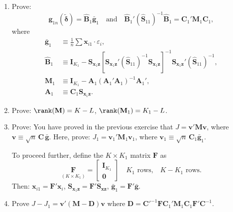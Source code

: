 \begin{problemset}
\begin{enumerate}[label=(\alph*)]
\item Prove:
  \[
    \mathbf{g}_{1n}(\tilde{\boldsymbol{\delta}})
    = \hat{\mathbf{B}}_1 \bar{\mathbf{g}}_1
    \quad \text{and} \quad
    \hat{\mathbf{B}}_1'(\hat{\mathbf{S}}_{11})^{-1} \hat{\mathbf{B}}_1
    = \mathbf{C}_1' \mathbf{M}_1 \mathbf{C}_1,
  \]
  where
  \begin{align*}
    \bar{\mathbf{g}}_1 &\equiv \frac{1}{n} \sum \mathbf{x}_{i1} \cdot \varepsilon_i, \\
    \hat{\mathbf{B}}_1 &\equiv \mathbf{I}_{K_1}
    - \mathbf{S}_{\mathbf{x}_1 \mathbf{z}}
    [\mathbf{S}_{\mathbf{x}_1 \mathbf{z}}'(\hat{\mathbf{S}}_{11})^{-1}
    \mathbf{S}_{\mathbf{x}_1 \mathbf{z}}]^{-1}
    \mathbf{S}_{\mathbf{x}_1 \mathbf{z}}'(\hat{\mathbf{S}}_{11})^{-1}, \\
    \mathbf{M}_1 &\equiv \mathbf{I}_{K_1}
    - \mathbf{A}_1(\mathbf{A}_1'\mathbf{A}_1)^{-1}\mathbf{A}_1', \\
    \mathbf{A}_1 &\equiv \mathbf{C}_1 \mathbf{S}_{\mathbf{x}_1 \mathbf{z}}.
  \end{align*}

\item Prove: $\rank(\mathbf{M}) = K - L$, $\rank(\mathbf{M}_1) = K_1 - L$.

\item Prove: You have proved in the previous exercise that
  $J = \mathbf{v}'\mathbf{M}\mathbf{v}$, where $\mathbf{v} \equiv \sqrt{n}\, \mathbf{C}\, \bar{\mathbf{g}}$.
  Here, prove: $J_1 = \mathbf{v}_1' \mathbf{M}_1 \mathbf{v}_1$, where
  $\mathbf{v}_1 \equiv \sqrt{n}\, \mathbf{C}_1 \bar{\mathbf{g}}_1$.

  To proceed further, define the $K \times K_1$ matrix $\mathbf{F}$ as
  \[
    \underset{(K \times K_1)}{\mathbf{F}}
    = \begin{bmatrix} \mathbf{I}_{K_1} \\ \mathbf{0} \end{bmatrix}
    \quad K_1 \text{ rows,} \quad K - K_1 \text{ rows.}
  \]
  Then: $\mathbf{x}_{i1} = \mathbf{F}'\mathbf{x}_i$,
  $\mathbf{S}_{\mathbf{x}_1 \mathbf{z}} = \mathbf{F}'\mathbf{S}_{\mathbf{xz}}$,
  $\bar{\mathbf{g}}_1 = \mathbf{F}'\bar{\mathbf{g}}$.

\item Prove $J - J_1 = \mathbf{v}'(\mathbf{M} - \mathbf{D})\mathbf{v}$ where
  $\mathbf{D} = \mathbf{C}'^{-1}\mathbf{F}\mathbf{C}_1'\mathbf{M}_1\mathbf{C}_1
  \mathbf{F}'\mathbf{C}^{-1}$.


\end{enumerate}
\end{problemset}
